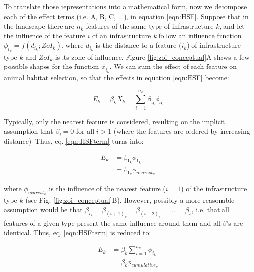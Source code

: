 \documentclass[titlepage]{article}
\begin{document}
To translate those representations into a mathematical form, now we decompose each of the effect terms (i.e. A, B, C, ...), in equation \ref{eqn:HSF}. Suppose that in the landscape there are $n_k$ features of the same type of infrastructure $k$, and let the influence of the feature $i$ of an infrastructure \textit{k} follow an influence function \citep[or ``weighting function", ][]{miguet_how_2017} $\phi_{i_k} = f(d_{i_k}; ZoI_k)$, where $d_{i_k}$ is the distance to a feature ($i_k$) of infrastructure type $k$ and $ZoI_k$ is its zone of influence. Figure \ref{fig:zoi_conceptual}A shows a few possible shapes for the function $\phi_{i_k}$. We can sum the effect of each feature on animal habitat selection, so that the effects in equation \ref{eqn:HSF} become:

\begin{equation}
\label{eqn:HSFterm}
    E_k = \beta_k X_k = \sum_{i=1}^{n_k} \beta_{i_k} \phi_{i_k}
\end{equation}

Typically, only the nearest feature is considered, resulting on the implicit assumption that $\beta_i = 0$ for all $i > 1$ (where the features are ordered by increasing distance). Thus, eq. \ref{eqn:HSFterm} turns into:

\begin{equation}
\label{eqn:HSFnearest}
\begin{split}
    E_k & = \beta_{1_k} \phi_{1_k} \\
        & = \beta_{1_k} \phi_{nearest_k}
\end{split}                
\end{equation}

where $\phi_{nearest_k}$ is the influence of the nearest feature ($i = 1$) of the infrastructure type $k$ (see Fig. \ref{fig:zoi_conceptual}B). However, possibly a more reasonable assumption would be that $\beta_{i_k} = \beta_{{(i+1)}_k} = \beta_{{(i+2)}_k} = ... = \beta_k$, i.e. that all features of a given type present the same influence around them and all $\beta$'s are identical. Thus, eq. \ref{eqn:HSFterm} is reduced to:

\begin{equation}
\label{eqn:HSFcuminf}
\begin{split}
    E_k & = \beta_k \sum_{i=1}^{n_k} \phi_{i_k} \\
        & = \beta_k \phi_{cumulative_k}
\end{split}
\end{equation}
\end{document}
